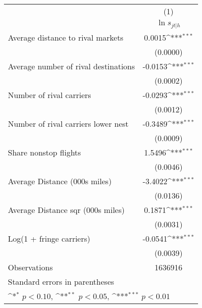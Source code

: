 {
\def\sym#1{\ifmmode^{#1}\else\(^{#1}\)\fi}
\begin{tabular}{l*{1}{c}}
\toprule
                    &\multicolumn{1}{c}{(1)}\\
                    &\multicolumn{1}{c}{$\ln s_{jt|h}$}\\
\midrule
Average distance to rival markets&      0.0015\sym{***}\\
                    &    (0.0000)         \\
\addlinespace
Average number of rival destinations&     -0.0153\sym{***}\\
                    &    (0.0002)         \\
\addlinespace
Number of rival carriers&     -0.0293\sym{***}\\
                    &    (0.0012)         \\
\addlinespace
Number of rival carriers lower nest&     -0.3489\sym{***}\\
                    &    (0.0009)         \\
\addlinespace
Share nonstop flights &      1.5496\sym{***}\\
                    &    (0.0046)         \\
\addlinespace
Average Distance (000s miles)&     -3.4022\sym{***}\\
                    &    (0.0136)         \\
\addlinespace
Average Distance sqr (000s miles)&      0.1871\sym{***}\\
                    &    (0.0031)         \\
\addlinespace
Log(1 + fringe carriers)&     -0.0541\sym{***}\\
                    &    (0.0039)         \\
\midrule
Observations        &     1636916         \\
\bottomrule
\multicolumn{2}{l}{\footnotesize Standard errors in parentheses}\\
\multicolumn{2}{l}{\footnotesize \sym{*} \(p<0.10\), \sym{**} \(p<0.05\), \sym{***} \(p<0.01\)}\\
\end{tabular}
}
